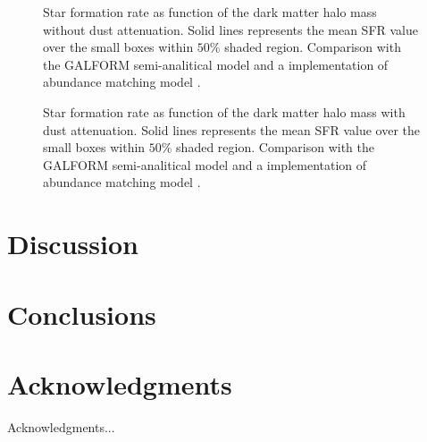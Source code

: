 \documentclass{emulateapj}
\begin{document}
\begin{figure}
\caption{Star formation rate as function of the dark matter halo mass without dust attenuation. 
Solid lines represents the mean SFR value over the small boxes within $50\%$  shaded region. 
Comparison with the GALFORM semi-analitical model \citep{gonzalez14} and a implementation
of abundance matching model \citep{Behroozi13}. }
\label{graph_SFR_DMHM_wo}
\end{figure}

\begin{figure}
\caption{Star formation rate as function of the dark matter halo mass with dust attenuation. 
Solid lines represents the mean SFR value over the small boxes within $50\%$  shaded region.
Comparison with the GALFORM semi-analitical model \citep{gonzalez14} and a implementation
of abundance matching model \citep{Behroozi13}. }
\label{graph_SFR_DMHM_w}
\end{figure}



\section{Discussion}
\label{sec:discussion}


\section{Conclusions}
\label{sec:conclusions}


\section*{Acknowledgments}
Acknowledgments...\\



\end{document}
